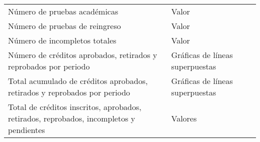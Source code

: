 \begin{table}[H]
\begin{tabular}{p{5cm}p{2.8cm}p{6cm}}
		Número de pruebas académicas                                                                                    & Valor                           &                                                                                                                                                                                                                                                                                     \\
		Número de pruebas de reingreso                                                                                  & Valor                           &                                                                                                                                                                                                                                                                                     \\
		Número de incompletos totales                                                                                   & Valor                           &                                                                                                                                                                                                                                                                                     \\
		Número de créditos aprobados, retirados y reprobados por periodo                                                & Gráficas de líneas superpuestas &                                                                                                                                                                                                                                                                                     \\
		Total acumulado de créditos aprobados, retirados y reprobados por periodo                                       & Gráficas de líneas superpuestas &                                                                                                                                                                                                                                                                                     \\
		Total de créditos inscritos, aprobados, retirados, reprobados, incompletos y pendientes                         & Valores                         &                                                                                                                                                                                                                                                                                     \\

\end{tabular}
\end{table}
